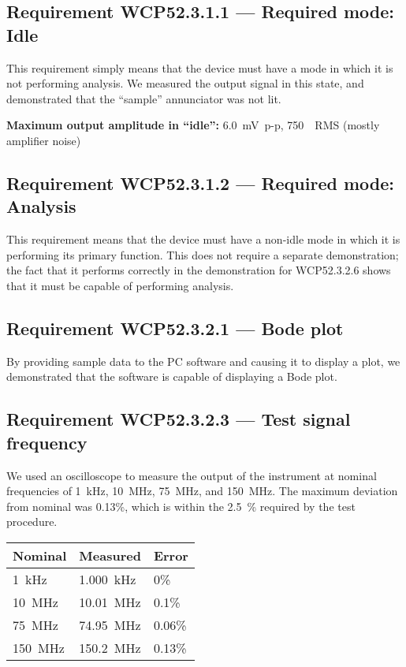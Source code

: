 \subsection*{Requirement WCP52.3.1.1 --- Required mode: Idle}
This requirement simply means that the device must have a mode in which it is
not performing analysis. We measured the output signal in this state, and
demonstrated that the ``sample'' annunciator was not lit.

\textbf{Maximum output amplitude in ``idle'':} 6.0~mV~p-p, 750~\uV~RMS (mostly amplifier noise)

\subsection*{Requirement WCP52.3.1.2 --- Required mode: Analysis}
This requirement means that the device must have a non-idle mode in which it is
performing its primary function. This does not require a separate demonstration;
the fact that it performs correctly in the demonstration for WCP52.3.2.6 shows
that it must be capable of performing analysis.

\subsection*{Requirement WCP52.3.2.1 --- Bode plot}
By providing sample data to the PC software and causing it to display a
plot, we demonstrated that the software is capable of displaying a Bode plot.

\subsection*{Requirement WCP52.3.2.3 --- Test signal frequency}
We used an oscilloscope to measure the output of the instrument at nominal
frequencies of 1~kHz, 10~MHz, 75~MHz, and 150~MHz. The maximum deviation from
nominal was 0.13\%, which is within the 2.5~\% required by the test procedure.

\begin{tabular}{|l|l|l|}
\hline
Nominal & Measured & Error \\ \hline \hline
1~kHz & 1.000~kHz & 0\% \\ \hline
10~MHz & 10.01~MHz & 0.1\% \\ \hline
75~MHz & 74.95~MHz & 0.06\% \\ \hline
150~MHz & 150.2~MHz & 0.13\% \\ \hline
\end{tabular}

